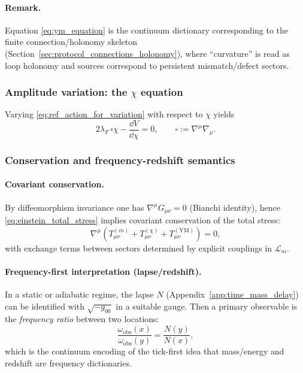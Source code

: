 \paragraph{Remark.}
\InterfaceTag Equation \eqref{eq:ym_equation} is the continuum dictionary corresponding to the finite connection/holonomy skeleton (Section~\ref{sec:protocol_connections_holonomy}), where ``curvature'' is read as loop holonomy and sources correspond to persistent mismatch/defect sectors.

\subsubsection{Amplitude variation: the \texorpdfstring{$\chi$}{chi} equation}
\label{subsec:chi_equation_variation}

\begin{proposition}
\label{prop:chi_eom}
Varying \eqref{eq:ref_action_for_variation} with respect to $\chi$ yields
\begin{equation}
\label{eq:chi_eom}
2\lambda_F\,\square\chi-\frac{\dd V}{\dd\chi}=0,
\qquad \square:=\nabla^\mu\nabla_\mu.
\end{equation}
\end{proposition}

\subsubsection{Conservation and frequency-redshift semantics}
\label{subsec:conservation_redshift}

\paragraph{Covariant conservation.}
\MathTag By diffeomorphism invariance one has $\nabla^\mu G_{\mu\nu}=0$ (Bianchi identity), hence \eqref{eq:einstein_total_stress} implies covariant conservation of the total stress:
\begin{equation}
\label{eq:total_stress_conservation}
\nabla^\mu\left(T^{(m)}_{\mu\nu}+T^{(\chi)}_{\mu\nu}+T^{(\mathrm{YM})}_{\mu\nu}\right)=0,
\end{equation}
with exchange terms between sectors determined by explicit couplings in $\mathcal{L}_m$.

\paragraph{Frequency-first interpretation (lapse/redshift).}
\InterfaceTag In a static or adiabatic regime, the lapse $N$ (Appendix~\ref{app:time_mass_delay}) can be identified with $\sqrt{-g_{00}}$ in a suitable gauge.
Then a primary observable is the \emph{frequency ratio} between two locations:
\[
\frac{\omega_{\mathrm{obs}}(x)}{\omega_{\mathrm{obs}}(y)}=\frac{N(y)}{N(x)},
\]
which is the continuum encoding of the tick-first idea that mass/energy and redshift are frequency dictionaries.

